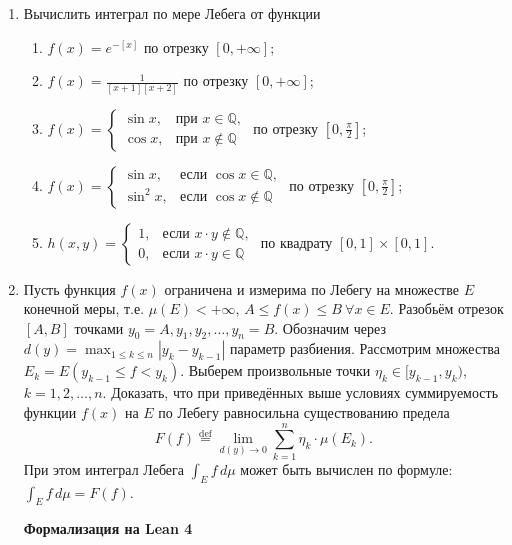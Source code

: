 \documentclass[12pt,a4paper]{article}
\begin{document}
\begin{enumerate}
\item Вычислить интеграл по мере Лебега от функции
\begin{enumerate}[label=\alph*)]
\item $f(x) = e^{-[x]}$ по отрезку $[0, +\infty]$;
\item $f(x) = \frac{1}{[x+1][x+2]}$ по отрезку $[0, +\infty]$;
\item $f(x) =
\begin{cases} \sin x, & \text{при } x \in \mathbb{Q}, \\ \cos x, & \text{при } x \notin \mathbb{Q}
\end{cases}$ по отрезку $[0, \frac{\pi}{2}]$;
\item $f(x) =
\begin{cases} \sin x, & \text{если } \cos x \in \mathbb{Q}, \\ \sin^{2}x, & \text{если } \cos x \notin \mathbb{Q}
\end{cases}$ по отрезку $[0, \frac{\pi}{2}]$;
\item $h(x,y) =
\begin{cases} 1, & \text{если } x \cdot y \notin \mathbb{Q}, \\ 0, & \text{если } x \cdot y \in \mathbb{Q}
\end{cases}$ по квадрату $[0,1] \times [0,1]$.
\end{enumerate}

\newpage
\item Пусть функция $f(x)$ ограничена и измерима по Лебегу на множестве $E$ конечной меры, т.е. $\mu(E) < +\infty$, $A \le f(x) \le B \ \forall x \in E$. Разобьём отрезок $[A, B]$ точками $y_{0} = A, y_{1}, y_{2}, \dots, y_{n} = B$. Обозначим через $d(y) = \max_{1 \le k \le n} |y_{k} - y_{k-1}|$ параметр разбиения. Рассмотрим множества $E_{k} = E(y_{k-1} \le f < y_{k})$. Выберем произвольные точки $\eta_{k} \in [y_{k-1}, y_{k})$, $k=1, 2, \dots, n$. Доказать, что при приведённых выше условиях суммируемость функции $f(x)$ на $E$ по Лебегу равносильна существованию предела
$$F(f) \overset{\text{def}}{=} \lim_{d(y) \rightarrow 0} \sum_{k=1}^{n} \eta_{k} \cdot \mu(E_{k}).$$
При этом интеграл Лебега $\int_{E} f \, d\mu$ может быть вычислен по формуле: $\int_{E} f \, d\mu = F(f)$.


\begin{center}\small\textbf{Формализация на Lean 4}\end{center}
\inputminted{lean}{FunAn/Section04_LebesgueIntegral/Task02.lean}


\end{enumerate}
\end{document}
